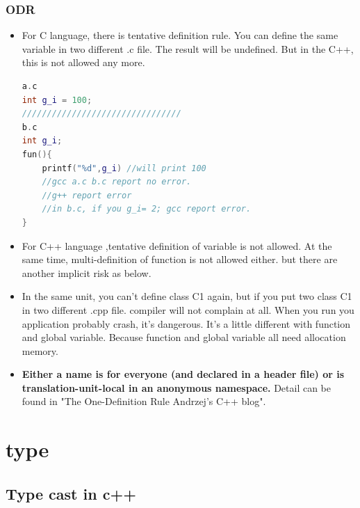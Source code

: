 \documentclass[a4paper,12pt,twoside]{book}
\begin{document}
\subsubsection{ODR}
\begin{itemize}
	
	\item For C language, there is tentative definition rule. You can define the same variable in two different .c file. The result will be undefined. But in the C++, this is not allowed any more. 
	
\begin{lstlisting}[frame=single, language=c++]
a.c
int g_i = 100;
////////////////////////////////
b.c
int g_i;
fun(){
	printf("%d",g_i) //will print 100
	//gcc a.c b.c report no error.
	//g++ report error
	//in b.c, if you g_i= 2; gcc report error.
}
\end{lstlisting}
	
	\item For C++ language ,tentative definition of variable is not allowed. At the same time, multi-definition of function is not allowed either. but there are another implicit risk as below. 
	
	\item In the same unit, you can't define class C1 again, but if you put two class C1 in two different .cpp file. compiler will not complain at all. When you run you application probably crash, it's dangerous. It's a little different with function and global variable. Because function and global variable all need allocation memory.
	
	\item \textbf{Either a name is for everyone (and declared in a header file) or is translation-unit-local in an anonymous namespace.} Detail can be found in "The One-Definition Rule  Andrzej's C++ blog".
	
\end{itemize}



\section{type}

\subsection{Type cast in c++}
\end{document}
